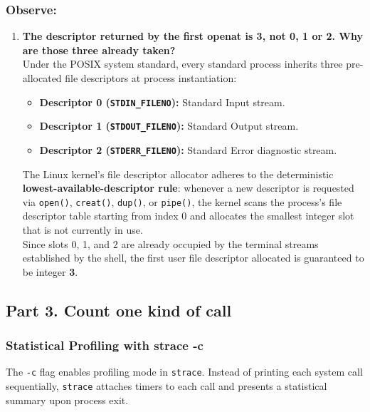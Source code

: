 \documentclass{labreport}
\begin{document}
\subsubsection*{Observe:}
\begin{enumerate}[leftmargin=*]
    \item \textbf{The descriptor returned by the first openat is 3, not 0, 1 or 2. Why are those three already taken?}\\[0.2em]
    Under the POSIX system standard, every standard process inherits three pre-allocated file descriptors at process instantiation:
    \begin{itemize}[noitemsep, topsep=2pt]
        \item \textbf{Descriptor 0 (\texttt{STDIN\_FILENO}):} Standard Input stream.
        \item \textbf{Descriptor 1 (\texttt{STDOUT\_FILENO}):} Standard Output stream.
        \item \textbf{Descriptor 2 (\texttt{STDERR\_FILENO}):} Standard Error diagnostic stream.
    \end{itemize}
    The Linux kernel's file descriptor allocator adheres to the deterministic \textbf{lowest-available-descriptor rule}: whenever a new descriptor is requested via \texttt{open()}, \texttt{creat()}, \texttt{dup()}, or \texttt{pipe()}, the kernel scans the process's file descriptor table starting from index 0 and allocates the smallest integer slot that is not currently in use.\\
    Since slots 0, 1, and 2 are already occupied by the terminal streams established by the shell, the first user file descriptor allocated is guaranteed to be integer \textbf{3}.
\end{enumerate}

\subsection{Part 3. Count one kind of call}

\subsubsection{Statistical Profiling with strace -c}
The \texttt{-c} flag enables profiling mode in \texttt{strace}. Instead of printing each system call sequentially, \texttt{strace} attaches timers to each call and presents a statistical summary upon process exit.
\end{document}
